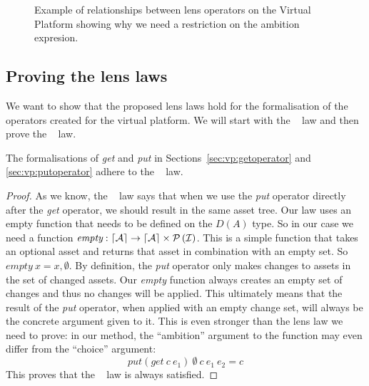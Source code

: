\begin{figure}
  \caption{Example of relationships between lens operators on the Virtual Platform showing why we need a restriction on the ambition expresion.}
  \label{fig:operator:vp:example}
\end{figure}

\subsection*{Proving the lens laws}
We want to show that the proposed lens laws hold for the formalisation of the
operators created for the virtual platform. We will start with the \getput~ law
and then prove the \putget~ law.

\begin{theorem}
  The formalisations of \emph{get} and \emph{put} in Sections~\ref{sec:vp:getoperator}
  and \ref{sec:vp:putoperator} adhere to the \getput~ law.
\end{theorem}

\begin{proof}
  As we know, the \getput~ law says that when we use the \emph{put} operator
  directly after the \emph{get} operator, we should result in the same asset
  tree. Our law uses an empty function that needs to be defined on the $D(A)$
  type. So in our case we need a function
  \(\textit{empty} : \lceil \mathcal{A} \rceil \rightarrow \lceil \mathcal{A} \rceil \times \mathcal{P} \left(\mathcal{I}\right)\).
  This is a simple function that takes an optional asset and returns that asset
  in combination with an empty set. So \(\textit{empty}~x = x, \emptyset\).
  By definition, the \emph{put} operator only makes changes to assets in the
  set of changed assets. Our \emph{empty} function always creates an empty set of
  changes and thus no changes will be applied. This ultimately means that the
  result of the \emph{put} operator, when applied with an empty change set, will
  always be the concrete argument given to it. This is even stronger than the
  lens law we need to prove: in our method, the ``ambition'' argument to the function
  may even differ from the ``choice'' argument:
  \[
    \mathit{put}\left(\mathit{get}~c~e_1\right)~\emptyset~c~e_1~e_2 = c
  \]
  This proves that the \getput~ law is always satisfied.
\end{proof}

